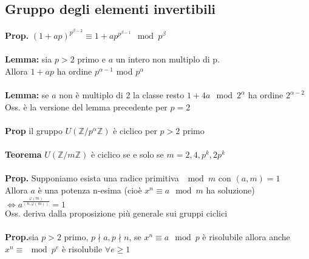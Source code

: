 \documentclass[10pt,a4paper]{article}
\begin{document}
\subsection{Gruppo degli elementi invertibili}
\textbf{Prop.} $(1+ap)^{p^{\beta -2}} \equiv 1+ap^{p^{\beta -1}} \mod p^\beta$\\\\ 
\textbf{Lemma:}  sia $p > 2$ primo e $a$ un intero non multiplo di p.\\
Allora $1+ap$ ha ordine $p^{\alpha-1}$ mod $p^\alpha$\\\\
\textbf{Lemma:} se $a$ non è multiplo di 2 la classe resto $1+4a \mod 2^\alpha$ ha ordine $2^{\alpha-2}$\\
Oss. è la versione del lemma precedente per $p=2$\\\\
\textbf{Prop} il gruppo $U(\mathbb{Z}/p^\alpha\mathbb{Z})$ è ciclico per $p>2$ primo\\\\
\textbf{Teorema} $U(\mathbb{Z}/m\mathbb{Z})$ è ciclico se e solo se $ m=2,4,p^k,2p^k $\\\\
\textbf{Prop.} Supponiamo esista una radice primitiva $\mod m$ con $(a,m)=1$\\
Allora $a$ è una potenza n-esima (cioè $x^n \equiv a \mod m$ ha soluzione) $\iff a^{\frac{\varphi(m)}{(n,\varphi(m))}}=1$\\
Oss. deriva dalla proposizione più generale sui gruppi ciclici\\\\
\textbf{Prop.}sia $p>2$ primo, $p \nmid a,p \nmid n$, se $x^n \equiv a \mod p$ è risolubile allora anche\\
$x^n \equiv \mod p^e$ è risolubile $\forall e \geq 1$
\end{document}
